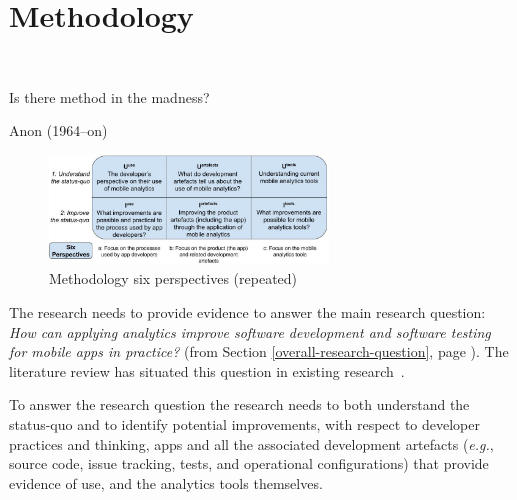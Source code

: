 \chapter{Methodology}~\label{chapter-methodology}
\epigraph{Is there method in the madness?}{Anon (1964--on)}

\begin{figure}
  \vspace{-0.75\intextsep}
  \begin{center}
    \includegraphics[width=0.66\textwidth]{images/my/six-perspectives-2x3-matrix-12-nov-2021.jpeg}
  \end{center}
    \caption{Methodology six perspectives (repeated)}
    \label{fig:six-perspectives-in-the-methodology}
\end{figure}

%

The research needs to provide evidence to answer the main research question: \emph{How can applying analytics improve software development and software testing for mobile apps in practice?} (from Section \ref{overall-research-question}, page \pageref{overall-research-question}). The literature review has situated this question in existing research~.  

To answer the research question the research needs to both understand the status-quo and to identify potential improvements, with respect to developer practices and thinking, apps and all the associated development artefacts (\textit{e.g.}, source code, issue tracking, tests, and operational configurations) that provide evidence of use, and the analytics tools themselves.

